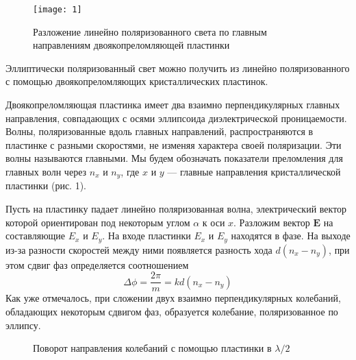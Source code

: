 \begin{wrapfigure}{r}{0.35\linewidth} 
	\texttt{[image: 1]}
	\caption{Разложение линейно поляризованного света по главным направлениям двоякопреломляющей пластинки}
	\label{ris 1}
\end{wrapfigure}

Эллиптически поляризованный свет можно получить из линейно поляризованного с
помощью двоякопреломляющих кристаллических пластинок.

Двоякопреломляющая пластинка имеет два взаимно перпендикулярных главных направления, совпадающих с осями эллипсоида диэлектрической проницаемости. Волны, поляризованные вдоль главных направлений, распространяются в пластинке с разными скоростями, не изменяя характера своей поляризации. Эти волны называются главными. Мы будем обозначать показатели преломления для главных волн через $ n_x $ и $ n_y $, где $ x $ и $ y $ --- главные направления кристаллической пластинки (рис. 1).

Пусть на пластинку падает линейно поляризованная волна, электрический вектор которой ориентирован под некоторым углом $ \alpha $ к оси
$ x $. Разложим вектор $ \mathbf{E} $ на составляющие $ E_x $ и $ E_y $. На входе пластинки $ E_x $ и $ E_y $ находятся в фазе. На выходе из-за разности скоростей между ними появляется разность хода $ d(n_x - n_y) $, при этом сдвиг фаз определяется соотношением
\begin{equation}\label{}
\Delta \phi =  \dfrac{2\pi}{m} = k d(n_x - n_y)
\end{equation}
Как уже отмечалось, при сложении двух взаимно перпендикулярных колебаний, обладающих некоторым сдвигом фаз, образуется колебание, поляризованное по эллипсу.

\begin{figure}[h!]
  \center{
	\texttt{[image: 2]}}
	\caption{Поворот направления колебаний с помощью пластинки в $ \lambda / 2 $}
	\label{ris 2}
\end{figure}

